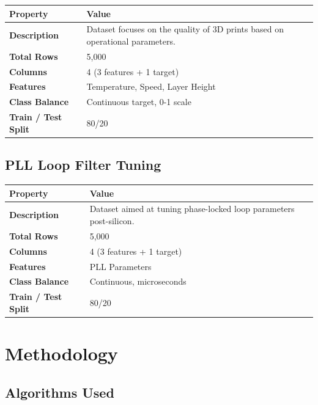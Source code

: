 \documentclass[11pt,a4paper]{article}
\begin{document}
\begin{tabularx}{\linewidth}{@{}>{\bfseries}l X @{}}
  \arrayrulecolor{tableheader}
  \toprule
  \rowcolor{tableheader} Property & Value \\
  \midrule
  \rowcolor{white} Description & Dataset focuses on the quality of 3D prints based on operational parameters. \\
  \rowcolor{tablerow} Total Rows & 5,000 \\
  \rowcolor{white} Columns & 4 (3 features + 1 target) \\
  \rowcolor{tablerow} Features & Temperature, Speed, Layer Height \\
  \rowcolor{white} Class Balance & Continuous target, 0-1 scale \\
  \rowcolor{tablerow} Train / Test Split & 80/20 \\
  \bottomrule
\end{tabularx}

\vspace{6pt}

\subsection{PLL Loop Filter Tuning}

\begin{tabularx}{\linewidth}{@{}>{\bfseries}l X @{}}
  \arrayrulecolor{tableheader}
  \toprule
  \rowcolor{tableheader} Property & Value \\
  \midrule
  \rowcolor{white} Description & Dataset aimed at tuning phase-locked loop parameters post-silicon. \\
  \rowcolor{tablerow} Total Rows & 5,000 \\
  \rowcolor{white} Columns & 4 (3 features + 1 target) \\
  \rowcolor{tablerow} Features & PLL Parameters \\
  \rowcolor{white} Class Balance & Continuous, microseconds \\
  \rowcolor{tablerow} Train / Test Split & 80/20 \\
  \bottomrule
\end{tabularx}

\section{Methodology}

\subsection{Algorithms Used}
\end{document}
